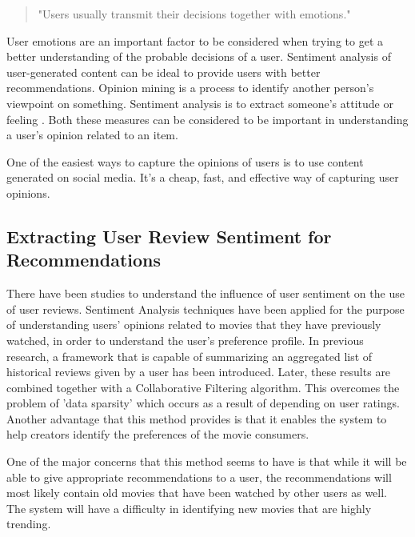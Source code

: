 \documentclass[manuscript,screen,review]{acmart}
\begin{document}
\begin{quote} 
\centering 
"Users usually transmit their decisions together with emotions."\cite{chen_user_2019}
\end{quote}

User emotions are an important factor to be considered when trying to get a better understanding of the probable decisions of a user. Sentiment analysis of user-generated content can be ideal to provide users with better recommendations. Opinion mining is a process to identify another person's viewpoint on something. Sentiment analysis is to extract someone's attitude or feeling \cite{nah_opinion_2018}. Both these measures can be considered to be important in understanding a user's opinion related to an item.

One of the easiest ways to capture the opinions of users is to use content generated on social media. It's a cheap, fast, and effective way of capturing user opinions.


\subsection{Extracting User Review Sentiment for Recommendations}
There have been studies to understand the influence of user sentiment on the use of user reviews.
Sentiment Analysis techniques have been applied for the purpose of understanding users' opinions related to movies that they have previously watched, in order to understand the user's preference profile. In previous research, \cite{cheng_hybrid_2020} a framework that is capable of summarizing an aggregated list of historical reviews given by a user has been introduced. Later, these results are combined together with a Collaborative Filtering algorithm. This overcomes the problem of 'data sparsity' which occurs as a result of depending on user ratings. 
Another advantage that this method provides is that it enables the system to help creators identify the preferences of the movie consumers.

One of the major concerns that this method seems to have is that while it will be able to give appropriate recommendations to a user, the recommendations will most likely contain old movies that have been watched by other users as well. The system will have a difficulty in identifying new movies that are highly trending.
\end{document}
